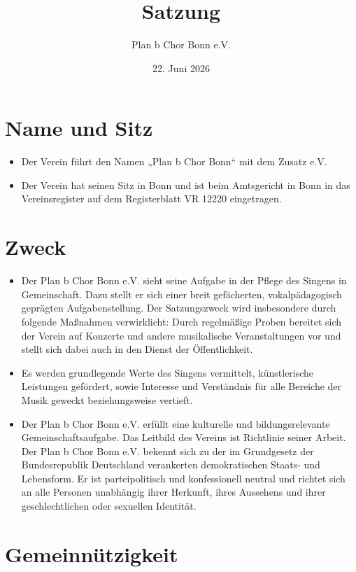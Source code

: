 \documentclass[12pt,paper=a4,ngerman]{report}
\title{\textbf{Satzung}}
\author{Plan b Chor Bonn e.V.}
\date{22. Juni 2026}
\begin{document}
\maketitle

\tableofcontents

\section{Name und Sitz}

\begin{itemize}
    \item Der Verein führt den Namen „Plan b Chor Bonn“ mit dem Zusatz e.V.
    \item Der Verein hat seinen Sitz in Bonn und ist beim Amtsgericht in Bonn in das Vereinsregister auf dem Registerblatt VR 12220 eingetragen.
\end{itemize}

\section{Zweck}

\begin{itemize}
    \item Der Plan b Chor Bonn e.V. sieht seine Aufgabe in der Pflege des Singens in Gemeinschaft. Dazu stellt er sich einer breit gefächerten, vokalpädagogisch geprägten Aufgabenstellung. Der Satzungszweck wird insbesondere durch folgende Maßnahmen verwirklicht: Durch regelmäßige Proben bereitet sich der Verein auf Konzerte und andere musikalische Veranstaltungen vor und stellt sich dabei auch in den Dienst der Öffentlichkeit.
    \item Es werden grundlegende Werte des Singens vermittelt, künstlerische Leistungen gefördert, sowie Interesse und Verständnis für alle Bereiche der Musik geweckt beziehungsweise vertieft.
    \item Der Plan b Chor Bonn e.V. erfüllt eine kulturelle und bildungsrelevante Gemeinschaftsaufgabe. Das Leitbild des Vereins ist Richtlinie seiner Arbeit. Der Plan b Chor Bonn e.V. bekennt sich zu der im Grundgesetz der Bundesrepublik Deutschland verankerten demokratischen Staats- und Lebensform. Er ist parteipolitisch und konfessionell neutral und richtet sich an alle Personen unabhängig ihrer Herkunft, ihres Aussehens und ihrer geschlechtlichen oder sexuellen Identität.
\end{itemize}

\section{Gemeinnützigkeit}
\end{document}
